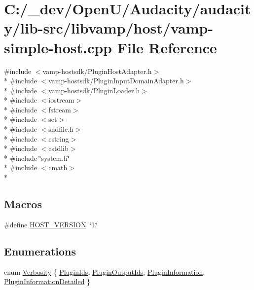 \hypertarget{vamp-simple-host_8cpp}{}\section{C\+:/\+\_\+dev/\+Open\+U/\+Audacity/audacity/lib-\/src/libvamp/host/vamp-\/simple-\/host.cpp File Reference}
\label{vamp-simple-host_8cpp}
{\ttfamily \#include $<$vamp-\/hostsdk/\+Plugin\+Host\+Adapter.\+h$>$}\\*
{\ttfamily \#include $<$vamp-\/hostsdk/\+Plugin\+Input\+Domain\+Adapter.\+h$>$}\\*
{\ttfamily \#include $<$vamp-\/hostsdk/\+Plugin\+Loader.\+h$>$}\\*
{\ttfamily \#include $<$iostream$>$}\\*
{\ttfamily \#include $<$fstream$>$}\\*
{\ttfamily \#include $<$set$>$}\\*
{\ttfamily \#include $<$sndfile.\+h$>$}\\*
{\ttfamily \#include $<$cstring$>$}\\*
{\ttfamily \#include $<$cstdlib$>$}\\*
{\ttfamily \#include \char`\"{}system.\+h\char`\"{}}\\*
{\ttfamily \#include $<$cmath$>$}\\*
\subsection*{Macros}
\begin{DoxyCompactItemize}
\item 
\#define \hyperlink{vamp-simple-host_8cpp_aa8bc193818940a8954ef0e0e5a8e16d6}{H\+O\+S\+T\+\_\+\+V\+E\+R\+S\+I\+ON}~\char`\"{}1.\char`\"{}
\end{DoxyCompactItemize}
\subsection*{Enumerations}
\begin{DoxyCompactItemize}
\item 
enum \hyperlink{vamp-simple-host_8cpp_abf3be10d03894afb391f3a2935e3b313}{Verbosity} \{ \hyperlink{vamp-simple-host_8cpp_abf3be10d03894afb391f3a2935e3b313a4cf6a0dfdb6864356feab9d9ca230d16}{Plugin\+Ids}, 
\hyperlink{vamp-simple-host_8cpp_abf3be10d03894afb391f3a2935e3b313a30eab122efa9537df4ecb2fc27fc354e}{Plugin\+Output\+Ids}, 
\hyperlink{vamp-simple-host_8cpp_abf3be10d03894afb391f3a2935e3b313a8acba147ed4716f3baa8546f6dc055a1}{Plugin\+Information}, 
\hyperlink{vamp-simple-host_8cpp_abf3be10d03894afb391f3a2935e3b313a2624ce417628b6d40ce0973ba381c1e6}{Plugin\+Information\+Detailed}
 \}
\end{DoxyCompactItemize}
